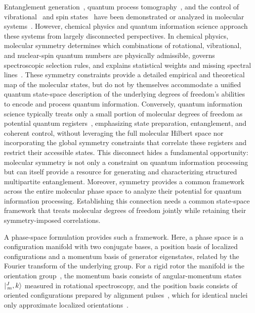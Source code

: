\documentclass[
  reprint,
  aps,
  prx,
  superscriptaddress,
  amsmath,
  amssymb,
  longbibliography
]{revtex4-2}
\begin{document}
Entanglement generation~\cite{Lin2020, Holland2023, Bao2023, Picard2025}, quantum process tomography~\cite{Chuntonov2013, YuenZhou2011}, and the control of vibrational~\cite{Hallas2023, Robichaud2026, Tesch2002} and spin states~\cite{Rugg2019, Ospelkaus2010, Gregory2021} have been demonstrated or analyzed in molecular systems~\cite{10.1063/5.0272970, Cornish2024, Langen2024, Deiss2024, Augenbraun2023}.  However, chemical physics and quantum information science approach these systems from largely disconnected perspectives. In chemical physics, molecular symmetry determines which combinations of rotational, vibrational, and nuclear-spin quantum numbers are physically admissible, governs spectroscopic selection rules, and explains statistical weights and missing spectral lines~\cite{LonguetHiggins1963, BunkerJensen2006, Chan2025}. These symmetry constraints provide a detailed empirical and theoretical map of the molecular states, but do not by themselves accommodate a unified quantum state-space description of the underlying degrees of freedom's abilities to encode and process quantum information. Conversely, quantum information science typically treats only a small portion of molecular degrees of freedom as potential quantum registers~\cite{DeMille2002, Yelin2006, Ni2018}, emphasizing state preparation, entanglement, and coherent control, without leveraging the full molecular Hilbert space nor incorporating the global symmetry constraints that correlate these registers and restrict their accessible states. This disconnect hides a fundamental opportunity: molecular symmetry is not only a constraint on quantum information processing but can itself provide a resource for generating and characterizing structured multipartite entanglement. Moreover, symmetry provides a common framework across the entire molecular phase space to analyze their potential for quantum information processing. Establishing this connection needs a common state-space framework that treats molecular degrees of freedom jointly while retaining their symmetry-imposed correlations.

A phase-space formulation provides such a framework. Here, a phase space is a configuration manifold with two conjugate bases, a position basis of localized configurations and a momentum basis of generator eigenstates, related by the Fourier transform of the underlying group. For a rigid rotor the manifold is the orientation group~\cite{PhysRevX.10.031050, Harter1993}, the momentum basis consists of angular-momentum states $\ket{{}^{J}_{\,m},k}$ measured in rotational spectroscopy, and the position basis consists of oriented configurations prepared by alignment pulses~\cite{Koch2019, Stapelfeldt2003}, which for identical nuclei only approximate localized orientations~\cite{GrohmannManz2018}. 
\end{document}
